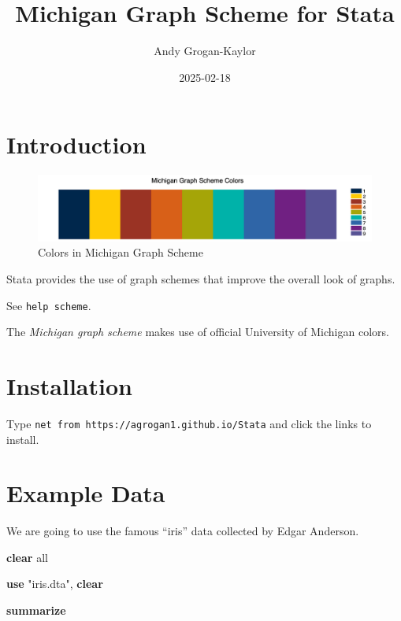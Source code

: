\documentclass[
  letterpaper,
  DIV=11,
  numbers=noendperiod]{scrartcl}
\title{Michigan Graph Scheme for Stata}
\author{Andy Grogan-Kaylor}
\date{2025-02-18}
\newenvironment{Shaded}{\begin{snugshade}}{\end{snugshade}}
\newcommand{\KeywordTok}[1]{\textcolor[rgb]{0.00,0.23,0.31}{\textbf{#1}}}
\newcommand{\NormalTok}[1]{\textcolor[rgb]{0.00,0.23,0.31}{#1}}
\newcommand{\OtherTok}[1]{\textcolor[rgb]{0.00,0.23,0.31}{#1}}
\newcommand{\StringTok}[1]{\textcolor[rgb]{0.13,0.47,0.30}{#1}}
\renewcommand*\contentsname{Table of contents}
\newcommand\contentsname{Table of contents}
\begin{document}
\maketitle

\renewcommand*\contentsname{Table of contents}
{
\hypersetup{linkcolor=}
\setcounter{tocdepth}{3}
\tableofcontents
}

\section{Introduction}\label{introduction}

\begin{figure}[H]

{\centering \includegraphics[width=0.75\linewidth,height=\textheight,keepaspectratio]{MichiganColorsStata.png}

}

\caption{Colors in Michigan Graph Scheme}

\end{figure}%

Stata provides the use of graph schemes that improve the overall look of
graphs.

See \texttt{help\ scheme}.

The \emph{Michigan graph scheme} makes use of official University of
Michigan colors.

\section{Installation}\label{installation}

Type \texttt{net\ from\ https://agrogan1.github.io/Stata} and click the
links to install.

\section{Example Data}\label{example-data}

We are going to use the famous ``iris'' data collected by Edgar
Anderson.

\begin{Shaded}
\begin{Highlighting}[]
\KeywordTok{clear} \OtherTok{all}
    
\KeywordTok{use} \StringTok{"iris.dta"}\NormalTok{, }\KeywordTok{clear}

\KeywordTok{summarize}
\end{Highlighting}
\end{Shaded}
\end{document}
